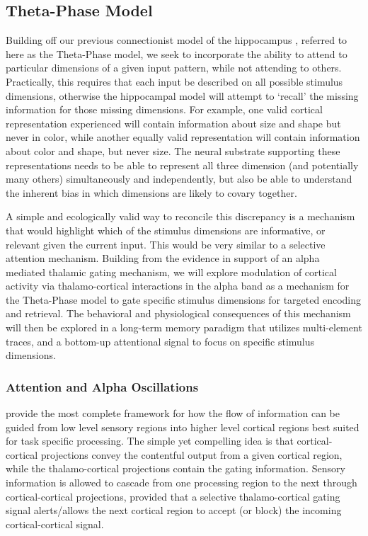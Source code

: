 \documentclass[11pt, titlepage, twoside]{article}
\providecommand{\DIFadd}[1]{{\protect\color{blue}\uwave{#1}}} %
\providecommand{\DIFaddbegin}{} %
\providecommand{\DIFaddend}{} %
\begin{document}
\subsection{Theta-Phase Model}

Building off our previous connectionist model of the hippocampus  \parencite{KetzMorkondaOReilly13}, referred to here as the Theta-Phase model, we seek to incorporate the ability to attend to particular dimensions of a given input pattern, while not attending to others.  Practically, this requires that each input be described on all possible stimulus dimensions, otherwise the hippocampal model will attempt to `recall' the missing information for those missing dimensions.  For example, one valid cortical representation experienced will contain information about size and shape but never in color, while another equally valid representation will contain information about color and shape, but never size.  The neural substrate supporting these representations needs to be able to represent all three dimension (and potentially many others) simultaneously and independently, but also be able to understand the inherent bias in which dimensions are likely to covary together.  


A simple and ecologically valid way to reconcile this discrepancy is a mechanism that would highlight which of the stimulus dimensions are informative, or relevant given the current input.  This would be very similar to a selective attention mechanism.  Building from the evidence in support of an alpha mediated thalamic gating mechanism, we will explore modulation of cortical activity via thalamo-cortical interactions in the alpha band as a mechanism for the Theta-Phase model to gate \DIFaddbegin \DIFadd{or modulate }\DIFaddend specific stimulus dimensions for targeted encoding and retrieval.  The behavioral and physiological consequences of this mechanism will then be explored in a long-term memory paradigm that utilizes multi-element traces, and a bottom-up attentional signal to focus on specific stimulus dimensions.


\subsubsection{Attention and Alpha Oscillations}
\textcite{ShermanGuillery06} provide the most complete framework for how the flow of information can be guided from low level sensory regions into higher level cortical regions best suited for task specific processing.  The simple yet compelling idea is that cortical-cortical projections convey the contentful output from a given cortical region, while the thalamo-cortical projections contain the gating information.  Sensory information is allowed to cascade from one processing region to the next through cortical-cortical projections, provided that a selective thalamo-cortical gating signal alerts/allows the next cortical region to accept (or block) the incoming cortical-cortical signal.  
\end{document}
